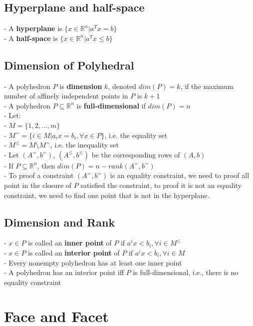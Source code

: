 			\subsection{Hyperplane and half-space}
				- A \textbf{hyperplane} is $\{x\in \mathbb{R}^n|a^Tx=b\}$\\
				- A \textbf{half-space} is  $\{x\in \mathbb{R}^n|a^Tx\le b\}$

			\subsection{Dimension of Polyhedral}
				- A polyhedron $P$ is \textbf{dimension} $k$, denoted $dim(P)=k$, if the maximum number of affinely independent points in $P$ is $k+1$\\
				- A polyhedron $P\subseteq \mathbb{R}^n$ is \textbf{full-dimensional} if $dim(P) = n$\\
				- Let:\\
				\indent - $M=\{1, 2, ..., m\}$\\
				\indent - $M^= = \{i \in M | a_ix=b_i, \forall x \in P\}$, i.e. the equality set\\
				\indent - $M^\le = M \setminus  M^=$, i.e. the inequality set\\
				- Let $(A^=, b^=)$, $(A^\le, b^\le)$ be the corresponding rows of $(A, b)$\\
				- If $P\subseteq \mathbb{R}^n$, then $dim(P) = n - rank(A^=, b^=)$\\
				- To proof a constraint $(A^=, b^=)$ is an equality constraint, we need to proof all point in the closure of $P$ satisfied the constraint, to proof it is not an equality constraint, we need to find one point that is not in the hyperplane.

			\subsection{Dimension and Rank}
				- $x\in P$ is called an \textbf{inner point} of $P$ if $a^ix < b_i, \forall i \in M^\le$\\
				- $x\in P$ is called an \textbf{interior point} of $P$ if $a^ix<b_i, \forall i \in M$\\
				- Every nonempty polyhedron has at least one inner point\\
				- A polyhedron has an interior point iff $P$ is full-dimensional, i.e., there is no equality constraint

		\section{Face and Facet}
